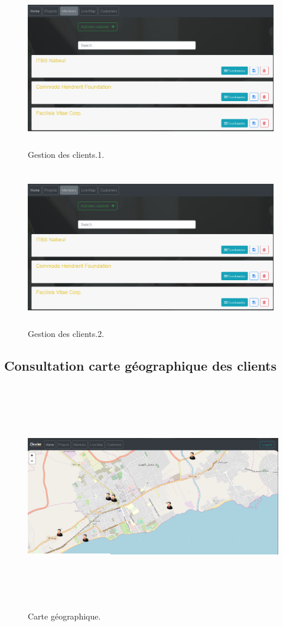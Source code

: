 \FloatBarrier
\begin{figure}[H]
\center
\includegraphics[width=11cm,height=7cm]{./figures/pres/cc1.png}
\caption{Gestion des clients.1.}
\end{figure}
\FloatBarrier


\FloatBarrier
\begin{figure}[H]
\center
\includegraphics[width=11cm,height=7cm]{./figures/pres/cc1.png}
\caption{Gestion des clients.2.}
\end{figure}
\FloatBarrier
\subsection{Consultation carte g\'{e}ographique des clients}

\FloatBarrier
\begin{figure}[H]
\center
\includegraphics[width=15cm,height=10cm]{./figures/pres/map.png}
\caption{Carte g\'{e}ographique.}
\end{figure}
\FloatBarrier
